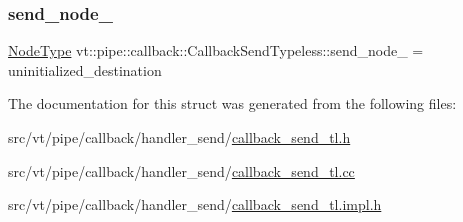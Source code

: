 \subsubsection{\texorpdfstring{send\+\_\+node\+\_\+}{send\_node\_}}
{\footnotesize\ttfamily \hyperlink{namespacevt_a866da9d0efc19c0a1ce79e9e492f47e2}{Node\+Type} vt\+::pipe\+::callback\+::\+Callback\+Send\+Typeless\+::send\+\_\+node\+\_\+ = uninitialized\+\_\+destination\hspace{0.3cm}{\ttfamily [private]}}



The documentation for this struct was generated from the following files\+:\begin{DoxyCompactItemize}
\item 
src/vt/pipe/callback/handler\+\_\+send/\hyperlink{callback__send__tl_8h}{callback\+\_\+send\+\_\+tl.\+h}\item 
src/vt/pipe/callback/handler\+\_\+send/\hyperlink{callback__send__tl_8cc}{callback\+\_\+send\+\_\+tl.\+cc}\item 
src/vt/pipe/callback/handler\+\_\+send/\hyperlink{callback__send__tl_8impl_8h}{callback\+\_\+send\+\_\+tl.\+impl.\+h}\end{DoxyCompactItemize}
